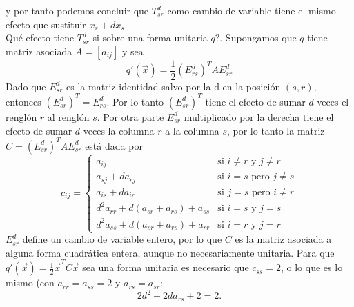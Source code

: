 y por tanto podemos concluir que $T_{sr}^{d}$ como cambio de variable tiene el mismo efecto que sustituir $x_{r} + dx_{s}$.\\ \textquestiondown Qué efecto tiene $T_{sr}^{d}$ si sobre una forma unitaria $q$?. Supongamos que $q$ tiene matriz asociada $A = \left[a_{ij}\right]$ y sea
\begin{equation*}
    q'(\overrightarrow{x}) = \frac{1}{2}\left(E_{rs}^{d}\right)^{T} A E_{sr}^{d}
\end{equation*}
Dado que $E_{sr}^{d}$ es la matriz identidad salvo por la d en la posición $(s, r)$, entonces $\left(E_{sr}^{d}\right)^{T} = E_{rs}^{d}$. Por lo tanto $\left(E_{sr}^{d}\right)^{T}$ tiene el efecto de sumar $d$ veces el renglón $r$ al renglón $s$. Por otra parte $E_{sr}^{d}$ multiplicado por la derecha tiene el efecto de sumar $d$ veces la columna $r$ a la columna $s$, por lo tanto la matriz $C = \left(E_{sr}^{d}\right)^{T} A E_{sr}^{d}$ está dada por
\begin{equation}
c_{ij} = \left \{ 
    \begin{matrix} 
    a_{ij} & \mbox{si } i \neq r \mbox{ y } j \neq r\\
    a_{sj} + da_{rj} & \mbox{si } i = s \mbox{ pero } j \neq s\\ 
    a_{is} + da_{ir} & \mbox{si } j = s \mbox{ pero } i \neq r\\
    d^{2}a_{rr} + d(a_{sr} + a_{rs}) + a_{ss} & \mbox{si } i = s \mbox{ y } j = s\\
    d^{2}a_{ss} + d(a_{sr} + a_{rs}) + a_{rr} & \mbox{si } i = r \mbox{ y } j = r
    \end{matrix}\right.
    \label{ecuacion:2.1}
\end{equation}
$E_{sr}^{d}$ define un cambio de variable entero, por lo que $C$ es la matriz asociada a alguna forma cuadrática entera, aunque no necesariamente unitaria. Para que $q'(\overrightarrow{x}) = \frac{1}{2}\overrightarrow{x}^{T}C\overrightarrow{x}$ sea una forma unitaria es necesario que $c_{ss} = 2$, o lo que es lo mismo (con $a_{rr} = a_{ss} = 2$ y $a_{rs} = a_{sr}$:
\begin{equation*}
    2d^{2} + 2da_{rs} + 2 = 2.
\end{equation*}
